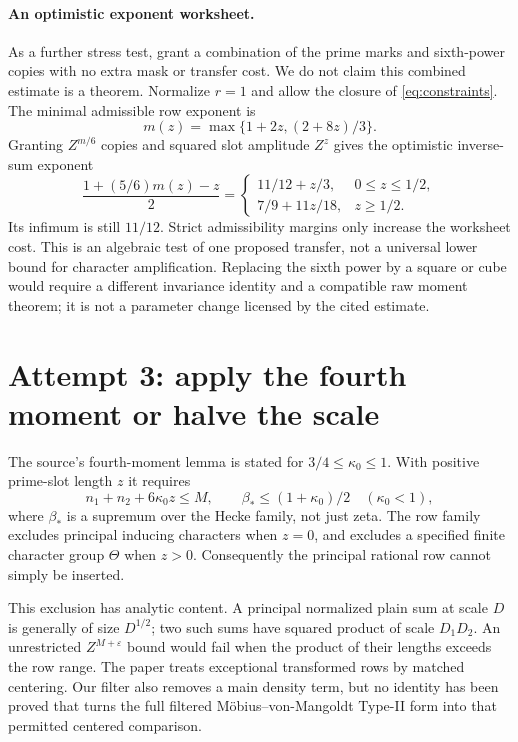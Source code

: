 \documentclass[11pt]{article}
\begin{document}
\paragraph{An optimistic exponent worksheet.}
As a further stress test, grant a combination of the prime marks and
sixth-power copies with no extra mask or transfer cost. We do not claim
this combined estimate is a theorem. Normalize $r=1$ and allow the
closure of \eqref{eq:constraints}. The minimal admissible row exponent is
\[
 m(z)=\max\{1+2z,(2+8z)/3\}.
\]
Granting $Z^{m/6}$ copies and squared slot amplitude $Z^z$ gives the
optimistic inverse-sum exponent
\begin{equation}\label{eq:worksheet}
 \frac{1+(5/6)m(z)-z}{2}
 =\begin{cases}
 11/12+z/3,&0\le z\le1/2,\\
 7/9+11z/18,&z\ge1/2.
 \end{cases}
\end{equation}
Its infimum is still $11/12$. Strict admissibility margins only increase
the worksheet cost. This is an algebraic test of one proposed transfer,
not a universal lower bound for character amplification. Replacing the
sixth power by a square or cube would require a different invariance
identity and a compatible raw moment theorem; it is not a parameter
change licensed by the cited estimate.

\section{Attempt 3: apply the fourth moment or halve the scale}
The source's fourth-moment lemma is stated for $3/4\le\kappa_0\le1$.
With positive prime-slot length $z$ it requires
\[
 n_1+n_2+6\kappa_0z\le M,
 \qquad \beta_*\le(1+\kappa_0)/2\quad(\kappa_0<1),
\]
where $\beta_*$ is a supremum over the Hecke family, not just zeta.
The row family excludes principal inducing characters when $z=0$, and
excludes a specified finite character group $\Theta$ when $z>0$.
Consequently the principal rational row cannot simply be inserted.

This exclusion has analytic content. A principal normalized plain sum
at scale $D$ is generally of size $D^{1/2}$; two such sums have squared
product of scale $D_1D_2$. An unrestricted $Z^{M+\varepsilon}$ bound
would fail when the product of their lengths exceeds the row range.
The paper treats exceptional transformed rows by matched centering.
Our filter also removes a main density term, but no identity has been
proved that turns the full filtered M\"obius--von-Mangoldt Type-II form
into that permitted centered comparison.
\end{document}
